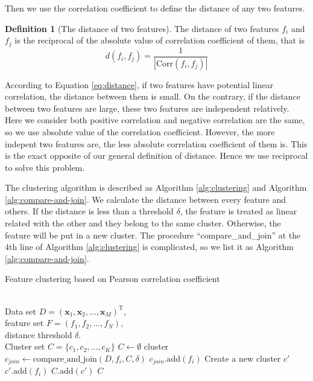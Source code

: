 \documentclass{ieeeaccess}
\theoremstyle{definition}
\newtheorem{defn}{Definition}
\begin{document}
Then we use the correlation coefficient to define the distance of any two features.

\begin{defn}[The distance of two features]
\label{def:distance}
The distance of two features $f_i$ and $f_j$ is the reciprocal of the absolute value of correlation coefficient of them, that is
\begin{equation}
    \label{eq:distance}
    d(f_i, f_j) = \frac{1}{|\text{Corr}(f_i, f_j)|}
\end{equation}
\end{defn}

According to Equation \ref{eq:distance}, if two features have potential linear correlation, the distance between them is small. On the contrary, if the distance between two features are large, these two features are independent relatively. Here we consider both positive correlation and negative correlation are the same, so we use absolute value of the correlation coefficient. However, the more indepent two features are, the less absolute correlation coefficient of them is. This is the exact opposite of our general definition of distance. Hence we use reciprocal to solve this problem.

The clustering algorithm is described as Algorithm \ref{alg:clustering} and Algorithm \ref{alg:compare-and-join}. We calculate the distance between every feature and others. If the distance is less than a threshold $\delta$, the feature is treated as linear related with the other and they belong to the same cluster. Otherwise, the feature will be put in a new cluster. The procedure ``compare\_and\_join'' at the 4th line of Algorithm \ref{alg:clustering} is complicated, so we list it as Algorithm \ref{alg:compare-and-join}.

\begin{algorithm}
\caption{Feature clustering based on Pearson correlation coefficient}
\label{alg:clustering}
\begin{algorithmic}[1]
\REQUIRE ~~\\
    Data set $D=(\bm{x}_1,\bm{x}_2,\ldots,\bm{x}_M)^\text{T}$, \\
    feature set $F=(f_1,f_2,\ldots,f_N)$, \\
    distance threshold $\delta$.
\ENSURE ~~\\
    Cluster set $C=\{c_1,c_2,\ldots,c_K\}$
\STATE $C \gets \emptyset$
        \STATE cluster $c_{join} \gets \text{compare\_and\_join}(D, f_i, C, \delta)$
            \STATE $c_{join}\text{.add}(f_i)$
        \ELSE
            \STATE Create a new cluster $c'$
            \STATE $c'\text{.add}(f_i)$
            \STATE $C\text{.add}(c')$
        \ENDIF
    \ENDIF
\ENDFOR
\RETURN $C$
\end{algorithmic}
\end{algorithm}
\end{document}
